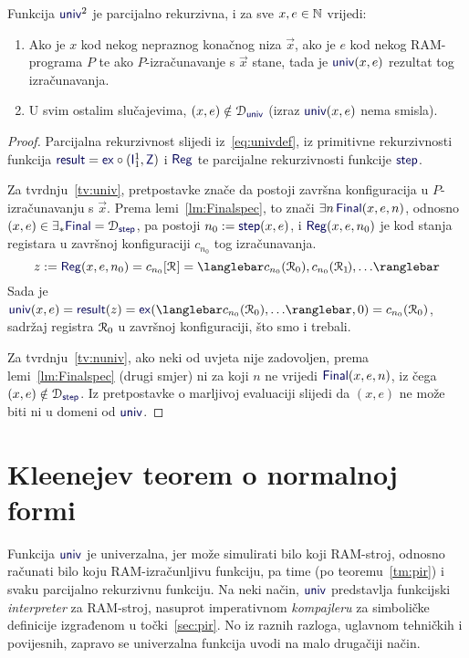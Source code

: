 \begin{lema}[{name=[parcijalna rekurzivnost univerzalne funkcije]}]\label{lm:univspec}
Funkcija $\f{univ}^2$ je parcijalno rekurzivna, i za sve $x,e\in{\mathbb N}$ vrijedi:
\begin{enumerate}
    \item\label{tv:univ} Ako je $x$ kod nekog nepraznog konačnog niza $\vec x$, ako je $e$ kod nekog RAM-programa $P$ te ako $P$-izračunavanje s $\vec x$ stane, tada je $\f{univ}(x,e)$ rezultat tog izračunavanja.
    \item\label{tv:nuniv} U svim ostalim slučajevima, $(x,e)\notin\dom{\f{univ}}$ (izraz $\f{univ}(x,e)$ nema smisla).
\end{enumerate}
\end{lema}
\begin{proof}
Parcijalna rekurzivnost slijedi iz~\eqref{eq:univdef}, iz primitivne rekurzivnosti funkcija $\f{result}=\f{ex}\circ(\f I_1^1,\f Z)$ i $\f{Reg}$ te parcijalne rekurzivnosti funkcije $\f{step}$.

Za tvrdnju~\ref{tv:univ}, pretpostavke znače da postoji završna konfiguracija u $P$-izračunavanju s $\vec x$. Prema lemi~\ref{lm:Finalspec}, to znači $\exists n\,\f{Final}(x,e,n)$, odnosno $(x,e)\in\exists_*\f{Final}=\dom{\f{step}}$, pa postoji $n_0:=\f{step}(x,e)$, i $\f{Reg}(x,e,n_0)$ je kod stanja registara u završnoj konfiguraciji $c_{n_0}$ tog izračunavanja.
\begin{equation}
	z:=\f{Reg}(x,e,n_0)=c_{n_0}[\reg{}]=\knk{c_{n_0}(\reg0),c_{n_0}(\reg1\mspace{-2mu}),\dotsc}
\end{equation}
Sada je $\f{univ}(x,e)=\f{result}(z)=\f{ex}(\knk{c_{n_0}(\reg0),\dotsc},0)=c_{n_0}(\reg0)$, sadržaj registra $\mathcal R_{0}$ u završnoj konfiguraciji, što smo i trebali.

Za tvrdnju~\ref{tv:nuniv}, ako neki od  uvjeta nije zadovoljen, prema lemi~\ref{lm:Finalspec} (drugi smjer) ni za koji $n$ ne vrijedi $\f{Final}(x,e,n)$, iz čega $(x,e)\notin\dom{\f{step}}$. Iz pretpostavke o marljivoj evaluaciji slijedi da $(x,e)$ ne može biti ni u domeni od $\f{univ}$.
\end{proof}

\section{Kleenejev teorem o normalnoj formi}

Funkcija $\f{univ}$ je univerzalna, jer može simulirati bilo koji RAM-stroj, odnosno ra\-ču\-na\-ti bilo koju RAM-izračunljivu funkciju, pa time (po teoremu~\ref{tm:pir}) i svaku parcijalno rekurzivnu funkciju. Na neki način, $\f{univ}$ predstavlja funkcijski \emph{interpreter} za RAM-stroj, nasuprot imperativnom \emph{kompajleru} za simboličke definicije izgrađenom u točki~\ref{sec:pir}. No iz raznih razloga, uglavnom tehničkih i povijesnih, zapravo se univerzalna funkcija uvodi na malo drugačiji način.

